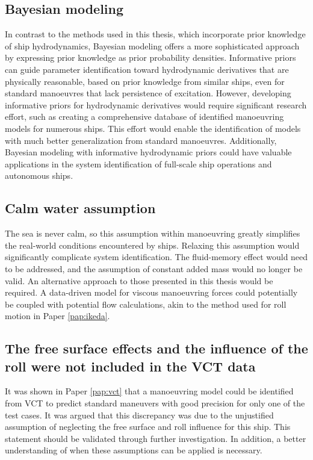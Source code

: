 \subsection*{Bayesian modeling}
In contrast to the methods used in this thesis, 
 which incorporate prior knowledge of ship hydrodynamics, Bayesian modeling offers a more sophisticated approach by expressing prior knowledge as prior probability densities. Informative priors can guide parameter identification toward hydrodynamic derivatives that are physically reasonable, based on prior knowledge from similar ships, even for standard manoeuvres that lack persistence of excitation. However, developing informative priors for hydrodynamic derivatives would require significant research effort, such as creating a comprehensive database of identified manoeuvring models for numerous ships. This effort would enable the identification of models with much better generalization from standard manoeuvres. Additionally, Bayesian modeling with informative hydrodynamic priors could have valuable applications in the system identification of full-scale ship operations and autonomous ships. 

\subsection*{Calm water assumption}
The sea is never calm, so this assumption within manoeuvring greatly simplifies the real-world conditions encountered by ships. Relaxing this assumption would significantly complicate system identification. The fluid-memory effect would need to be addressed, and the assumption of constant added mass would no longer be valid. An alternative approach to those presented in this thesis would be required. A data-driven model for viscous manoeuvring forces could potentially be coupled with potential flow calculations, akin to the method used for roll motion in Paper \ref{pap:ikeda}.
    
\subsection*{The free surface effects and the influence of the roll were not included in the VCT data}
It was shown in Paper \ref{pap:vct} that a manoeuvring model could be identified from VCT to predict standard maneuvers with good precision for only one of the test cases. It was argued that this discrepancy was due to the unjustified assumption of neglecting the free surface and roll influence for this ship. This statement should be validated through further investigation. In addition, a better understanding of when these assumptions can be applied is necessary.  
        
